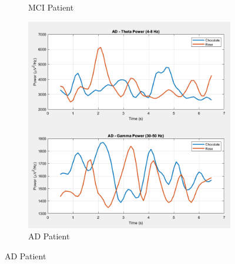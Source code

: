 \documentclass[hidelinks,12pt]{article}
\begin{document}
\begin{figure}[!h]
\begin{subfigure}{0.32\textwidth}
			\caption{MCI Patient}
		\end{subfigure}
		\hfill
		\begin{subfigure}{0.32\textwidth}
			\centering
			\includegraphics[height=\linewidth]{plots/7}
			\caption{AD Patient}
		\end{subfigure}
	\end{figure}
	
	
	
\end{document}
